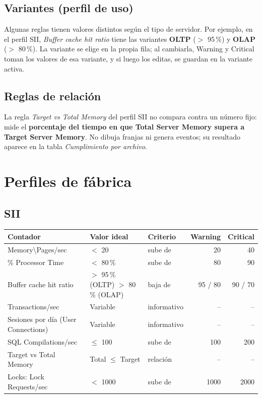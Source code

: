 \documentclass[11pt,a4paper,oneside]{report}
\newcommand{\bs}{\textbackslash}
\begin{document}
\subsection{Variantes (perfil de uso)}
Algunas reglas tienen valores distintos según el tipo de servidor. Por
ejemplo, en el perfil SII, \emph{Buffer cache hit ratio} tiene las variantes
\textbf{OLTP} ($>$ 95\,\%) y \textbf{OLAP} ($>$ 80\,\%). La variante se elige
en la propia fila; al cambiarla, Warning y Critical toman los valores de esa
variante, y si luego los editas, se guardan en la variante activa.

\subsection{Reglas de relación}
La regla \emph{Target vs Total Memory} del perfil SII no compara contra un
número fijo: mide el \textbf{porcentaje del tiempo en que Total Server Memory
supera a Target Server Memory}. No dibuja franjas ni genera eventos; su
resultado aparece en la tabla \emph{Cumplimiento por archivo}.

\section{Perfiles de fábrica}

\subsection*{SII}
\begin{center}
\small
\begin{tabularx}{\textwidth}{XL{3.0cm}lrr}
  \toprule
  Contador & Valor ideal & Criterio & Warning & Critical \\
  \midrule
  Memory\bs Pages/sec & $<$ 20 & sube de & 20 & 40 \\
  \% Processor Time & $<$ 80\,\% & sube de & 80 & 90 \\
  Buffer cache hit ratio & $>$ 95\,\% (OLTP) \newline $>$ 80\,\% (OLAP) & baja de &
    95 / 80 & 90 / 70 \\
  Transactions/sec & Variable & informativo & -- & -- \\
  Sesiones por día (User Connections) & Variable & informativo & -- & -- \\
  SQL Compilations/sec & $\le$ 100 & sube de & 100 & 200 \\
  Target vs Total Memory & Total $\le$ Target & relación & -- & -- \\
  Locks: Lock Requests/sec & $<$ 1000 & sube de & 1000 & 2000 \\
  \bottomrule
\end{tabularx}
\end{center}
\end{document}
